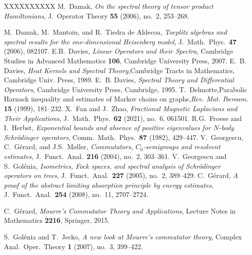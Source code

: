 \documentclass[10pt]{amsart}
\newcommand{\1}{{\mathbb{I}}}
\numberwithin{equation}{section}
\begin{document}
\begin{thebibliography}{XXXXXXXXXX}
 M.\ Damak, \emph{On the spectral theory of tensor product Hamiltonians}, J.\ Operator Theory {\bf 55} (2006), no.\ 2, 253--268.

 M.\ Damak, M.\ Mantoiu, and R.\ Tiedra de Aldecoa, \emph{Toeplitz algebras and spectral results for the one-dimensional Heisenberg model}, J.\ Math.\ Phys.\ {\bf 47} (2006), 082107.
     E.B.\ Davies, \emph{Linear Operators and their Spectra}, Cambridge Studies in Advanced Mathematics {\bf 106}, Cambridge University Press, 2007.
E.~B. Davies, \emph{Heat Kernels and Spectral Theory},Cambridge Tracts in Mathematics, Cambridge Univ. Press, 1989.
E.~B. Davies,
\emph{Spectral Theory and Differential Operators},
Cambridge University Press, Cambridge, 1995.
 T.~Delmotte,Parabolic Harnack inequality and estimates of Markov chains on graphs,\emph{Rev. Mat. Iberoam.} \textbf{15} (1999), 181--232.
 X.\ Fan and J.\ Zhao, \emph{Fractional Magnetic Laplacians and Their Applications}, J.\ Math.\ Phys.\ {\bf 62} (2021), no.\ 6, 061501.
 R.G.\ Froese and I.\ Herbst, \emph{Exponential bounds and absence of positive eigenvalues for $N$-body Schr\"odinger operators}, Comm.\ Math.\ Phys.\ {\bf 87} (1982), 429--447.
 V.\ Georgescu, C.\ G\'erard, and J.S.\ M\o ller, \emph{Commutators, $C_0$-semigroups and resolvent estimates}, J.\ Funct.\ Anal.\ {\bf 216} (2004), no.\ 2, 303--361.
 V.\ Georgescu and S.\ Gol\'enia, \emph{Isometries, Fock spaces, and spectral analysis of Schr\"odinger operators on trees}, J.\ Funct.\ Anal.\ {\bf 227} (2005), no.\ 2, 389--429.
 C.\ G\'erard, \emph{A proof of the abstract limiting absorption principle by energy estimates}, J.\ Funct.\ Anal.\ {\bf 254} (2008), no.\ 11, 2707--2724.

 C.\ G\'erard, \emph{Mourre's Commutator Theory and Applications}, Lecture Notes in Mathematics {\bf 2216}, Springer, 2015.


 S.\ Gol\'enia and T.\ Jecko, \emph{A new look at Mourre's commutator theory}, Complex Anal.\ Oper.\ Theory {\bf 1} (2007), no.\ 3, 399--422.


\end{thebibliography}
\end{document}
